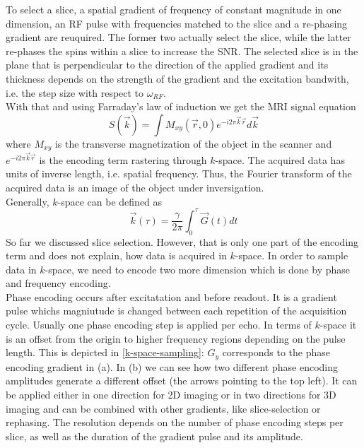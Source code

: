 To select a slice, a spatial gradient of frequency of constant magnitude in one dimension, an RF pulse with frequencies matched to the slice and a re-phasing gradient are reuquired.
The former two actually select the slice, while the latter re-phases the spins within a slice to increase the SNR.
The selected slice is in the plane that is perpendicular to the direction of the applied gradient and its thickness depends on the strength of the gradient and the excitation bandwith, i.e. the step size with respect to $\omega_{RF}$. \\

With that and using Farraday's law of induction we get the MRI signal equation
\[ S(\overrightarrow{k}) = \int M_{xy} (\overrightarrow{r}, 0) e^{-i 2 \pi \overrightarrow{k} \overrightarrow{r}} d \overrightarrow{k} \]
where $M_{xy}$ is the transverse magnetization of the object in the scanner and $e^{-i 2 \pi \overrightarrow{k} \overrightarrow{r}}$ is the encoding term rastering through $k$-space.
The acquired data has units of inverse length, i.e. spatial frequency.
Thus, the Fourier transform of the acquired data is an image of the object under inversigation. \\

Generally, $k$-space can be defined as
\[ \overrightarrow{k}(\tau) = \frac{\gamma}{2 \pi} \int_0^\tau \overrightarrow{G}(t) dt \]
So far we discussed slice selection.
However, that is only one part of the encoding term and does not explain, how data is acquired in $k$-space.
In order to sample data in $k$-space, we need to encode two more dimension which is done by phase and frequency encoding. \\

Phase encoding occurs after excitatation and before readout.
It is a gradient pulse whichs magniutude is changed between each repetition of the acquisition cycle.
Usually one phase encoding step is applied per echo.
In terms of $k$-space it is an offset from the origin to higher frequency regions depending on the pulse length.
This is depicted in \ref{k-space-sampling}: $G_y$ corresponds to the phase encoding gradient in (a).
In (b) we can see how two different phase encoding amplitudes generate a different offset (the arrows pointing to the top left).
It can be applied either in one direction for 2D imaging or in two directions for 3D imaging and can be combined with other gradients, like slice-selection or rephasing.
The resolution depends on the number of phase encoding steps per slice, as well as the duration of the gradient pulse and its amplitude.

